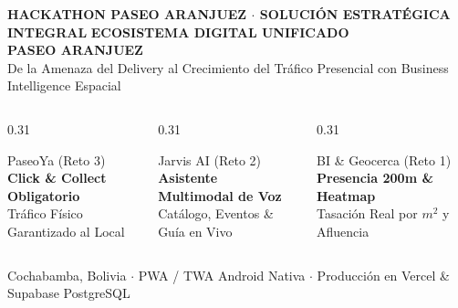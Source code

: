 \documentclass[aspectratio=169, 10pt]{beamer}
\begin{document}
\begin{frame}[plain]

  \begin{center}
    \vspace{0.3cm}
    {\scriptsize \color{AranjuezOrange} \textbf{HACKATHON PASEO ARANJUEZ $\cdot$ SOLUCIÓN ESTRATÉGICA INTEGRAL}}
    \vskip 0.2cm
    {\LARGE \textbf{\color{white}ECOSISTEMA DIGITAL UNIFICADO}} \\
    \vskip 0.1cm
    {\Large \textbf{\color{AranjuezGold}PASEO ARANJUEZ}} \\
    \vskip 0.15cm
    {\footnotesize \color{AranjuezMuted} De la Amenaza del Delivery al Crecimiento del Tráfico Presencial con Business Intelligence Espacial}
    \vskip 0.5cm

    \begin{columns}[c]
      \begin{column}{0.31\textwidth}
        \begin{alertblock}{PaseoYa (Reto 3)}
          \centering \scriptsize \textbf{Click \& Collect Obligatorio} \\ Tráfico Físico Garantizado al Local
        \end{alertblock}
      \end{column}
      \begin{column}{0.31\textwidth}
        \begin{block}{Jarvis AI (Reto 2)}
          \centering \scriptsize \textbf{Asistente Multimodal de Voz} \\ Catálogo, Eventos \& Guía en Vivo
        \end{block}
      \end{column}
      \begin{column}{0.31\textwidth}
        \begin{exampleblock}{BI \& Geocerca (Reto 1)}
          \centering \scriptsize \textbf{Presencia 200m \& Heatmap} \\ Tasación Real por $m^2$ y Afluencia
        \end{exampleblock}
      \end{column}
    \end{columns}

    \vskip 0.4cm
    {\tiny \color{AranjuezMuted} Cochabamba, Bolivia $\cdot$ PWA / TWA Android Nativa $\cdot$ Producción en Vercel \& Supabase PostgreSQL}
  \end{center}
\end{frame}
\end{document}
